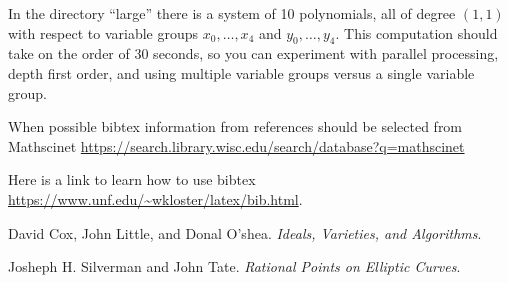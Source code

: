 \documentclass[12pt]{article}
\theoremstyle{definition}
\newcommand{\red}[1]{{\color{red}#1}}
\begin{document}
In the directory ``large'' there is a system of 10 polynomials, all of 
degree $(1,1)$ with respect to variable groups $x_0, \ldots, x_4$ and 
$y_0, \ldots, y_4$. This computation should take on the order of 30 
seconds, so you can experiment with parallel processing, depth first 
order, and using multiple variable groups versus a single variable 
group.


\red{
When possible bibtex information from references 
should be selected from Mathscinet
\url{https://search.library.wisc.edu/search/database?q=mathscinet}

\noindent Here is a link to learn how to use bibtex\newline
\url{https://www.unf.edu/~wkloster/latex/bib.html}.

}
\begin{thebibliography}{9}
David Cox, John Little, and Donal O'shea.
\textit{Ideals, Varieties, and Algorithms}. 

Josheph H. Silverman and John Tate.
\textit{Rational Points on Elliptic Curves}. 
 
\end{thebibliography}
\end{document}
